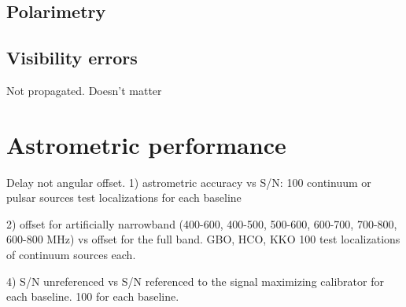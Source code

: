 \documentclass[twocolumn]{aastex631}
\newcommand{\todo}[1]{{\color{red}$\blacksquare$~\textsf{[TODO: #1]}}}
\begin{document}



\subsection{Polarimetry}

\subsection{Visibility errors}
Not propagated. Doesn't matter

\section{Astrometric performance}


Delay not angular offset.
1) astrometric accuracy vs S/N: 100 continuum or pulsar sources test localizations for each baseline

2) offset for artificially narrowband (400-600, 400-500, 500-600, 600-700, 700-800, 600-800 MHz) vs offset for the full band. GBO, HCO, KKO 100 test localizations of continuum sources each. 



4) S/N unreferenced vs S/N referenced to the signal maximizing calibrator for each baseline.  100 for each baseline.


\end{document}
